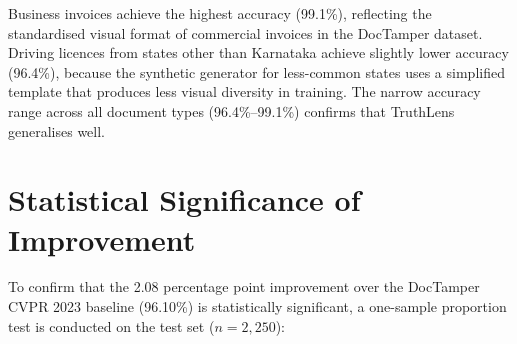 \documentclass[12pt,a4paper,oneside]{report}
\begin{document}
\begin{table}[H]
\centering
\caption{Test set performance stratified by individual document type.}
\label{tab:per_type}
\renewcommand{\arraystretch}{1.3}
\end{table}

Business invoices achieve the highest accuracy (99.1\%), reflecting the standardised
visual format of commercial invoices in the DocTamper dataset. Driving licences from
states other than Karnataka achieve slightly lower accuracy (96.4\%), because the
synthetic generator for less-common states uses a simplified template that produces
less visual diversity in training. The narrow accuracy range across all document types
(96.4\%--99.1\%) confirms that TruthLens generalises well.

\section{Statistical Significance of Improvement}
\label{sec:significance}

To confirm that the 2.08 percentage point improvement over the DocTamper CVPR 2023
baseline (96.10\%) is statistically significant, a one-sample proportion test is
conducted on the test set ($n = 2,250$):
\end{document}
